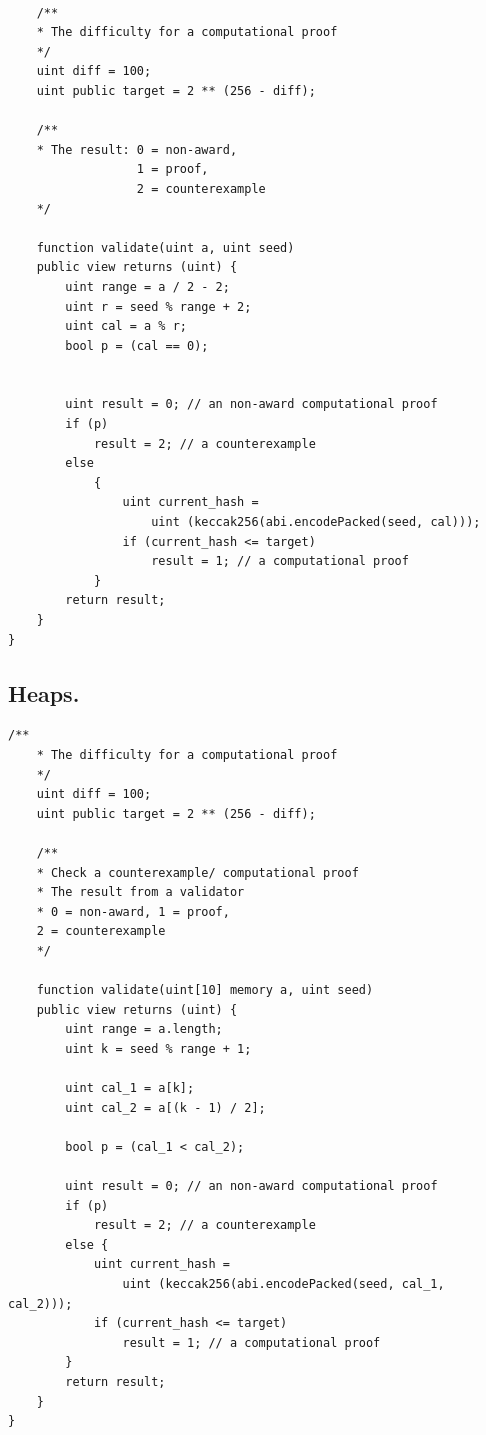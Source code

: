 \documentclass[runningheads]{llncs}
\begin{document}
\begin{lstlisting}[numbers=none]

    /**
    * The difficulty for a computational proof
    */
    uint diff = 100;
    uint public target = 2 ** (256 - diff); 

    /**
    * The result: 0 = non-award, 
                  1 = proof, 
                  2 = counterexample
    */

    function validate(uint a, uint seed) 
    public view returns (uint) {
        uint range = a / 2 - 2; 
        uint r = seed % range + 2;
        uint cal = a % r;
        bool p = (cal == 0);
        

        uint result = 0; // an non-award computational proof 
        if (p)  
            result = 2; // a counterexample
        else 
            {
                uint current_hash = 
                    uint (keccak256(abi.encodePacked(seed, cal)));
                if (current_hash <= target) 
                    result = 1; // a computational proof    
            }
        return result;           
    }
}

\end{lstlisting}


\subsection{Heaps.}
\begin{lstlisting}[numbers=none]
    /**
    * The difficulty for a computational proof
    */
    uint diff = 100;
    uint public target = 2 ** (256 - diff); 

    /**
    * Check a counterexample/ computational proof
    * The result from a validator
    * 0 = non-award, 1 = proof, 
    2 = counterexample
    */

    function validate(uint[10] memory a, uint seed) 
    public view returns (uint) {
        uint range = a.length; 
        uint k = seed % range + 1;

        uint cal_1 = a[k];
        uint cal_2 = a[(k - 1) / 2];
        
        bool p = (cal_1 < cal_2);

        uint result = 0; // an non-award computational proof 
        if (p)  
            result = 2; // a counterexample
        else {
            uint current_hash = 
                uint (keccak256(abi.encodePacked(seed, cal_1, cal_2)));
            if (current_hash <= target) 
                result = 1; // a computational proof      
        }              
        return result;           
    }
}

\end{lstlisting}
\end{document}
